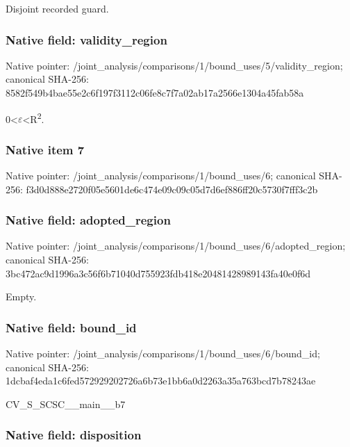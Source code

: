 \documentclass[10pt,a4paper]{article}
\begin{document}
Disjoint recorded guard.


\subsubsection{Native field: validity\_region}


Native pointer: /joint\_analysis/comparis\allowbreak{}ons/1/bound\_uses/5/valid\allowbreak{}ity\_region; canonical SHA-256: 8582f549b4bae55e2c6f197f\allowbreak{}3112c06fe8c7f7a02ab17a25\allowbreak{}66e1304a45fab58a


0<\ensuremath{\varepsilon}<R\textsuperscript{2}.


\subsubsection{Native item 7}


Native pointer: /joint\_analysis/comparis\allowbreak{}ons/1/bound\_uses/6; canonical SHA-256: f3d0d888e2720f05e5601de6\allowbreak{}c474e09c09c05d7d6ef886ff\allowbreak{}20c5730f7fff3c2b



\subsubsection{Native field: adopted\_region}


Native pointer: /joint\_analysis/comparis\allowbreak{}ons/1/bound\_uses/6/adopt\allowbreak{}ed\_region; canonical SHA-256: 3bc472ac9d1996a3c56f6b71\allowbreak{}040d755923fdb418e2048142\allowbreak{}8989143fa40e0f6d


Empty.


\subsubsection{Native field: bound\_id}


Native pointer: /joint\_analysis/comparis\allowbreak{}ons/1/bound\_uses/6/bound\allowbreak{}\_id; canonical SHA-256: 1dcbaf4eda1c6fed57292920\allowbreak{}2726a6b73e1bb6a0d2263a35\allowbreak{}a763bcd7b78243ae


CV\_S\_SCSC\_\_main\_\_b7


\subsubsection{Native field: disposition}
\end{document}
